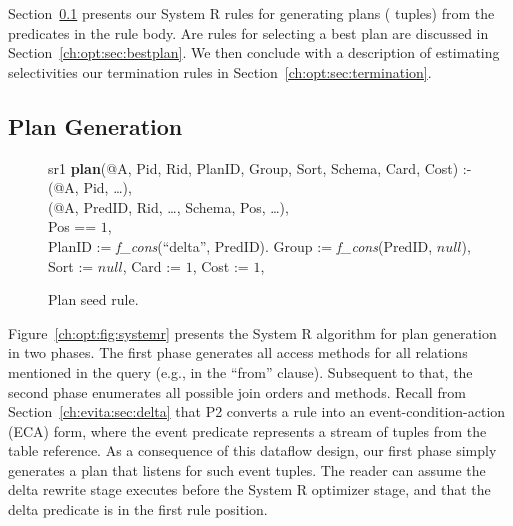 Section~\ref{ch:opt:sec:plangen} presents our System R rules for generating
plans ( tuples) from the predicates in the rule body.  Are rules for
selecting a best plan are discussed in Section~\ref{ch:opt:sec:bestplan}.  We
then conclude with a description of estimating selectivities our termination
rules in Section~\ref{ch:opt:sec:termination}.

\subsection{Plan Generation}
\label{ch:opt:sec:plangen}

\begin{figure*}
\ssp
\centering
\begin{boxedminipage}{\linewidth}
sr1 {\bf plan}(@A, Pid, Rid, PlanID, Group, Sort, Schema, Card, Cost) :- \\
(@A, Pid, \ldots),\\
(@A, PredID, Rid, \ldots, Schema, Pos, \ldots),\\
\datalogspace Pos == $1$,\\
\datalogspace PlanID := {\em f\_cons}(``delta'', PredID).
\datalogspace Group := {\em f\_cons}(PredID, $null$),\\
\datalogspace Sort := $null$,
\datalogspace Card := $1$, Cost := $1$,\\
\end{boxedminipage}
\caption{\label{ch:opt:fig:planseed}Plan seed rule.}
\end{figure*}

Figure~\ref{ch:opt:fig:systemr} presents the System R algorithm for plan
generation in two phases.  The first phase generates all access methods for all
relations mentioned in the query (e.g., in the ``from'' clause).  Subsequent to
that, the second phase enumerates all possible join orders and methods.  Recall
from Section~\ref{ch:evita:sec:delta} that P2 converts a rule into an
event-condition-action (ECA) form, where the event predicate represents a
stream of tuples from the table reference.  As a consequence of this dataflow
design, our first phase simply generates a plan that listens for such event
tuples.  The reader can assume the delta rewrite stage executes before the
System R optimizer stage, and that the delta predicate is in the first rule
position.  

